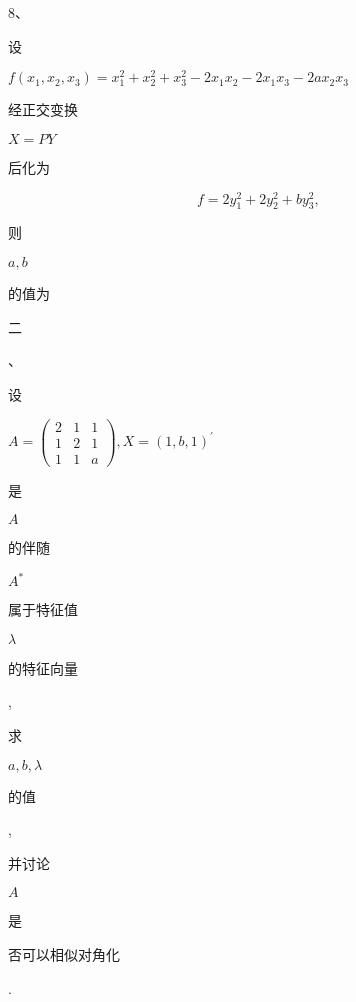 \documentclass[10pt]{article}
\begin{document}
8、\begin{CJK}{UTF8}{mj}设\end{CJK} $f\left(x_{1}, x_{2}, x_{3}\right)=x_{1}^{2}+x_{2}^{2}+x_{3}^{2}-2 x_{1} x_{2}-2 x_{1} x_{3}-2 a x_{2} x_{3}$ \begin{CJK}{UTF8}{mj}经正交变换\end{CJK} $X=P Y$ \begin{CJK}{UTF8}{mj}后化为\end{CJK}
$$
f=2 y_{1}^{2}+2 y_{2}^{2}+b y_{3}^{2} \text {, }
$$
\begin{CJK}{UTF8}{mj}则\end{CJK} $a, b$ \begin{CJK}{UTF8}{mj}的值为\end{CJK} \begin{CJK}{UTF8}{mj}二\end{CJK}、\begin{CJK}{UTF8}{mj}设\end{CJK} $A=\left(\begin{array}{lll}2 & 1 & 1 \\ 1 & 2 & 1 \\ 1 & 1 & a\end{array}\right), X=(1, b, 1)^{\prime}$ \begin{CJK}{UTF8}{mj}是\end{CJK} $A$ \begin{CJK}{UTF8}{mj}的伴随\end{CJK} $A^{*}$ \begin{CJK}{UTF8}{mj}属于特征值\end{CJK} $\lambda$ \begin{CJK}{UTF8}{mj}的特征向量\end{CJK}, \begin{CJK}{UTF8}{mj}求\end{CJK} $a, b, \lambda$ \begin{CJK}{UTF8}{mj}的值\end{CJK}, \begin{CJK}{UTF8}{mj}并讨论\end{CJK} $A$ \begin{CJK}{UTF8}{mj}是\end{CJK} \begin{CJK}{UTF8}{mj}否可以相似对角化\end{CJK}.
\end{document}
